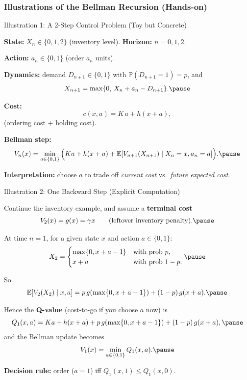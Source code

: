 \documentclass[aspectratio=169]{beamer}
\begin{document}
\subsubsection{Illustrations of the Bellman Recursion (Hands-on)}

\begin{frame}{Illustration 1: A 2-Step Control Problem (Toy but Concrete)}

\textbf{State:} $X_n\in\{0,1,2\}$ (inventory level). \qquad
\textbf{Horizon:} $n=0,1,2$.\pause

\medskip
\textbf{Action:} $a_n\in\{0,1\}$ (order $a_n$ units).\pause

\medskip
\textbf{Dynamics:} demand $D_{n+1}\in\{0,1\}$ with
$\mathbb{P}(D_{n+1}=1)=p$, and
\[
X_{n+1}=\max\{0,\,X_n+a_n-D_{n+1}\}.
\vspace{-5mm}\pause
\]

\medskip
\textbf{Cost:}
\[
c(x,a)=K\,a + h(x+a),
\]
(ordering cost + holding cost).\pause

\medskip
\textbf{Bellman step:}
\[
V_n(x)=\min_{a\in\{0,1\}}
\Big( K a+h(x+a) + \mathbb{E}[V_{n+1}(X_{n+1})\mid X_n=x,a_n=a]\Big).\pause
\]

\medskip
\textbf{Interpretation:} choose $a$ to trade off \emph{current cost} vs.\ \emph{future expected cost}.

\end{frame}

\begin{frame}{Illustration 2: One Backward Step (Explicit Computation)}

Continue the inventory example, and assume a \textbf{terminal cost}
\[
V_2(x)=g(x)=\gamma x \qquad (\text{leftover inventory penalty}).
\vspace{-5mm}\pause
\]

\medskip
At time $n=1$, for a given state $x$ and action $a\in\{0,1\}$:
\[
X_2=
\begin{cases}
\max\{0,x+a-1\} & \text{with prob } p,\\
x+a & \text{with prob } 1-p.
\end{cases}
\vspace{-5mm}\pause
\]

So
\[
\mathbb{E}[V_2(X_2)\mid x,a]
=
p\,g(\max\{0,x+a-1\})+(1-p)\,g(x+a).
\vspace{-2mm}\pause
\]

Hence the \textbf{Q-value} (cost-to-go if you choose $a$ now) is
\[
Q_1(x,a)=Ka+h(x+a)+p\,g(\max\{0,x+a-1\})+(1-p)\,g(x+a),\pause
\]
and the Bellman update becomes
\[
V_1(x)=\min_{a\in\{0,1\}} Q_1(x,a).\pause
\]

\medskip
\textbf{Decision rule:} order ($a=1$) iff $Q_1(x,1)\le Q_1(x,0)$.

\end{frame}
\end{document}
